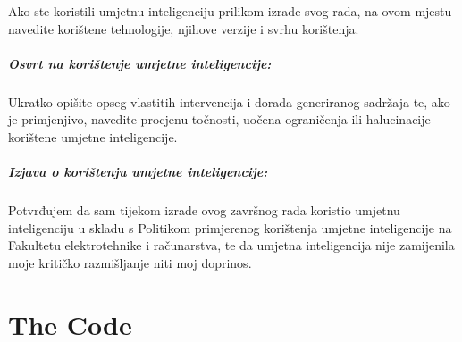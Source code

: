 \documentclass[zavrsnirad]{fer}
\begin{document}

\begin{izjavaoui}

  Ako ste koristili umjetnu inteligenciju prilikom izrade svog rada,
  na ovom mjestu navedite korištene tehnologije, njihove verzije i svrhu korištenja.

  \paragraph{Osvrt na korištenje umjetne inteligencije:}
  Ukratko opišite opseg vlastitih intervencija i dorada generiranog sadržaja te, ako je primjenjivo,
  navedite procjenu točnosti, uočena ograničenja ili halucinacije korištene umjetne inteligencije.

  \paragraph{Izjava o korištenju umjetne inteligencije:}
  Potvrđujem da sam tijekom izrade ovog završnog rada koristio umjetnu inteligenciju u skladu s
  Politikom primjerenog korištenja umjetne inteligencije na Fakultetu elektrotehnike i računarstva,
  te da umjetna inteligencija nije zamijenila moje kritičko razmišljanje niti moj doprinos.

\end{izjavaoui}



\backmatter

\chapter{The Code}

\Blindtext
\end{document}
